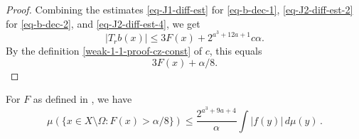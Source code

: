\begin{proof}
Combining the estimates \eqref{eq-J1-diff-est} for \eqref{eq-b-dec-1}, \eqref{eq-J2-diff-est-2} for \eqref{eq-b-dec-2}, and \eqref{eq-J2-diff-est-4}, we get
\begin{equation*}
    |T_rb(x)|\leq 3F(x)+2^{a^3+12a+1}c\alpha.
\end{equation*}
By the definition \eqref{weak-1-1-proof-cz-const} of $c$, this equals
\begin{equation*}
    3F(x)+\alpha/8.
\end{equation*}
\end{proof}

\begin{lemma}
    \label{estimate-F-set}
    \leanok
    For $F$ as defined in , we have
    \begin{equation}
        \label{eq-F-X-minus-Omega}
        \mu(\{x\in X\setminus\Omega: F(x)>\alpha/8\}) \le \frac{2^{a^3+9a+4}}{\alpha} \int |f(y)|\,d\mu(y)\,.
    \end{equation}
\end{lemma}

